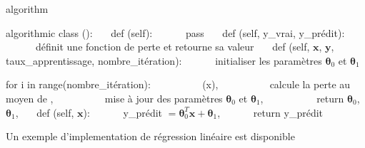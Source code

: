 \documentclass[letterpaper,11pt,english]{sphinxmanual}
\begin{document}
\begin{sphinxuseclass}{algorithm}
\begin{sphinxuseclass}{algorithmic}
\sphinxAtStartPar
class ():    def  (self):
      pass    def (self, y\_vrai, y\_prédit):
      définit une fonction de perte et retourne sa valeur    def
(self, \(\mathbf{x}\), \(\mathbf{y}\),
taux\_apprentissage, nombre\_itération):       initialiser les
paramètres \(\boldsymbol{\theta}_0\) et
\(\boldsymbol{\theta}_1\)

\sphinxAtStartPar
for i in range(nombre\_itération):           (x),
          calcule la perte au moyen de ,
          mise à jour des paramètres \(\boldsymbol{\theta}_0\)
et \(\boldsymbol{\theta}_1\),           return
\(\boldsymbol{\theta}_0\), \(\boldsymbol{\theta}_1\),
   def (self, \(\mathbf{x}\)):       y\_prédit
\(= \boldsymbol{\theta}_0^T \mathbf{x} + \boldsymbol{\theta}_1\),
      return y\_prédit

\end{sphinxuseclass}
\end{sphinxuseclass}
\sphinxAtStartPar
Un exemple d’implementation de régression linéaire est disponible
%
\begin{footnote}[7]\sphinxAtStartFootnote
{}
%
\end{footnote}
\end{document}
